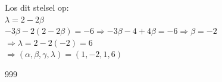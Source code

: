 \documentclass[a4paper]{article}
\begin{document}
Los dit stelsel op:\\

$\lambda = 2 - 2\beta$\\

$-3\beta - 2(2 - 2\beta) = -6 \Rightarrow -3\beta - 4 + 4\beta = -6 \Rightarrow \beta = -2$\\

$\Rightarrow \lambda = 2 - 2(-2) = 6$\\

$\Rightarrow (\alpha, \beta, \gamma, \lambda) = (1, -2, 1, 6)$\\

\begin{thebibliography}{999}
\end{thebibliography}
\end{document}
